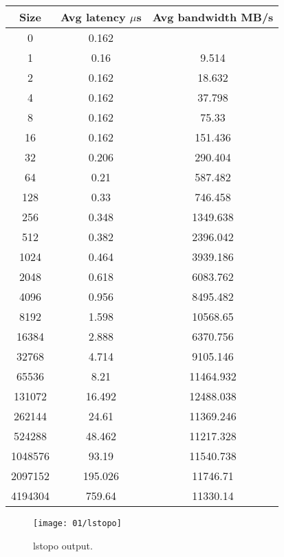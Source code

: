 \documentclass[UTF-8]{article}
\begin{document}
    
    
    \begin{center}
    \begin{tabular}{|c|c|c|}
    	\hline
    	Size & Avg latency $\mu$s & Avg bandwidth MB/s \\
    	\hline
    	0 & 0.162 &  \\
    	\hline
    	1 & 0.16 & 9.514 \\
    	\hline
    	2 & 0.162 & 18.632 \\
    	\hline
    	4 & 0.162 & 37.798 \\
    	\hline
    	8 & 0.162 & 75.33 \\
    	\hline
    	16 & 0.162 & 151.436 \\
    	\hline
    	32 & 0.206 & 290.404 \\
    	\hline
    	64 & 0.21 & 587.482 \\
    	\hline
    	128 & 0.33 & 746.458 \\
    	\hline
    	256 & 0.348 & 1349.638 \\
    	\hline
    	512 & 0.382 & 2396.042 \\
    	\hline
    	1024 & 0.464 & 3939.186 \\
    	\hline
    	2048 & 0.618 & 6083.762 \\
    	\hline
    	4096 & 0.956 & 8495.482 \\
    	\hline
    	8192 & 1.598 & 10568.65 \\
    	\hline
    	16384 & 2.888 & 6370.756 \\
    	\hline
    	32768 & 4.714 & 9105.146 \\
    	\hline
    	65536 & 8.21 & 11464.932 \\
    	\hline
    	131072 & 16.492 & 12488.038 \\
    	\hline
    	262144 & 24.61 & 11369.246 \\
    	\hline
    	524288 & 48.462 & 11217.328 \\
    	\hline
    	1048576 & 93.19 & 11540.738 \\
    	\hline
    	2097152 & 195.026 & 11746.71 \\
    	\hline
    	4194304 & 759.64 & 11330.14 \\
    	\hline
    \end{tabular}
\end{center}
    





\begin{figure}[H]
	\centering
	\texttt{[image: 01/lstopo]}
	\caption{lstopo output.}
	\label{fig:lstopo}
\end{figure}
\end{document}
